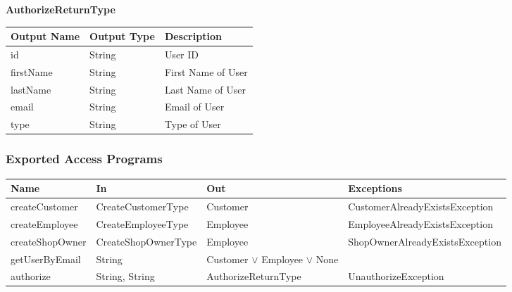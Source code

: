 \documentclass[12pt, titlepage]{article}
\begin{document}
\textbf{AuthorizeReturnType}

\begin{table}[H]
	\begin{tabular}{|p{}|p{}|p{}|}
		\hline
		\textbf{Output Name} & \textbf{Output Type} & \textbf{Description} \\
		\hline
		id                   & String               & User ID              \\
		\hline
		firstName            & String               & First Name of User   \\
		\hline
		lastName             & String               & Last Name of User    \\
		\hline
		email                & String               & Email of User        \\
		\hline
		type                 & String               & Type of User         \\
		\hline
	\end{tabular}
\end{table}

\subsubsection{Exported Access Programs}

\begin{center}
	\begin{adjustbox}{width=\textwidth}
		\begin{tabular}{llll}
			\hline
			\textbf{Name}   & \textbf{In}         & \textbf{Out}                         & \textbf{Exceptions}             \\
			\hline
			createCustomer  & CreateCustomerType  & Customer                             & CustomerAlreadyExistsException  \\
			createEmployee  & CreateEmployeeType  & Employee                             & EmployeeAlreadyExistsException  \\
			createShopOwner & CreateShopOwnerType & Employee                             & ShopOwnerAlreadyExistsException \\
			getUserByEmail  & String              & Customer $\lor$ Employee $\lor$ None & ~                               \\
			authorize       & String, String      & AuthorizeReturnType                  & UnauthorizeException            \\
			\hline
		\end{tabular}
	\end{adjustbox}
\end{center}
\end{document}
